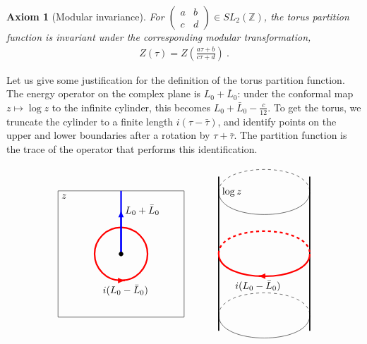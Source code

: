 \documentclass[12pt, a4paper]{article}
\theoremstyle{break}
\newtheorem{hyp}[exo]{Axiom}
\begin{document}
\begin{hyp}[Modular invariance]
For $\left(\begin{smallmatrix} a & b \\ c & d\end{smallmatrix}\right)\in SL_2(\mathbb{Z})$, the torus partition function is invariant under the corresponding modular transformation,
\begin{align}
 Z(\tau) = Z\left(\frac{a\tau+b}{c\tau +d} \right)\ .
\end{align}
\end{hyp}
\begin{tcolorbox}
Let us give some justification for the definition of the torus partition function. The energy operator on the complex plane is $L_0+\bar{L}_0$: under the conformal map $z\mapsto \log z$ to the infinite cylinder, this becomes $L_0+\bar{L}_0-\frac{c}{12}$. To get the torus, we truncate the cylinder to a finite length $i(\tau-\bar{\tau})$, and identify points on the upper and lower boundaries after a rotation by $\tau+\bar{\tau}$. The partition function is the trace of the operator that performs this identification.
\begin{align*}
\renewcommand{\arraystretch}{1.3}
\renewcommand{\arraycolsep}{6mm}
\begin{array}{ccc}
 \begin{tikzpicture}[scale = .45, baseline=(current  bounding  box.center)]
  \draw (-5, -5) -- (5, -5) -- (5, 5) -- (-5, 5) node[below right]{$z$} -- cycle;
  \draw [red, ultra thick] (0, 0) circle (2.1);
  \draw [red, ultra thick, -latex] (.3, -2.1) -- (.35, -2.1) node[black, below] {$i(L_0-\bar{L}_0)$};
  \draw [blue, ultra thick] (0, 0) -- (0, 5);
  \draw [blue, ultra thick, -latex] (0, 0) -- (0, 3.5) node[black, right] {$L_0+\bar{L}_0$};
  \node[draw, circle, inner sep=1.5pt, fill] at (0, 0) {};
 \end{tikzpicture}
 & 
 \begin{tikzpicture}[xscale = .65, yscale = .55, baseline=(current  bounding  box.center)]
  \draw [very thick] (0, -5) -- (0, 5);
  \draw [very thick] (5, -5) -- (5, 5);
  \draw (0, -4) to [out = -90, in = -90] (5, -4);
  \draw [dashed] (0, -4) to [out = 90, in = 90] (5, -4);
  \draw (0, 4) node[right] {$\log z$} to [out = -90, in = -90] (5, 4);
  \draw [dashed] (0, 4) to [out = 90, in = 90] (5, 4);
  \draw [red, ultra thick] (0, 0) to [out = -90, in = -90] (5, 0);
  \draw [red, ultra thick, dashed] (0, 0) to [out = 90, in = 90] (5, 0);
  \draw [red, ultra thick, -latex] (2.2, -1.45) -- (2.15, -1.45) node[black, below] {$i(L_0-\bar{L}_0)$};

\end{tikzpicture}
\end{array}
\end{align*}
\end{tcolorbox}
\end{document}
